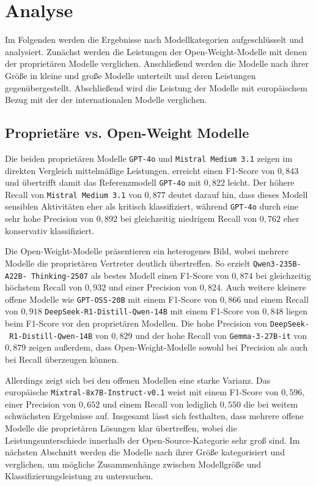 \section{Analyse}\label{sec:analyse}

Im Folgenden werden die Ergebnisse nach Modellkategorien aufgeschlüsselt und analysiert. Zunächst werden die Leistungen der Open-Weight-Modelle mit denen der proprietären Modelle verglichen. Anschließend werden die Modelle nach ihrer Größe in kleine und große Modelle unterteilt und deren Leistungen gegenübergestellt. Abschließend wird die Leistung der Modelle mit europäischem Bezug mit der der internationalen Modelle verglichen.

\subsection*{Proprietäre vs. Open-Weight Modelle}

Die beiden proprietären Modelle \texttt{GPT-4o} und \texttt{Mistral Medium 3.1} zeigen im direkten Vergleich mittelmäßige Leistungen.  erreicht einen F1-Score von $0{,}843$ und übertrifft damit das Referenzmodell \texttt{GPT-4o} mit $0{,}822$ leicht. Der höhere Recall von \texttt{Mistral Medium 3.1} von $0{,}877$ deutet darauf hin, dass dieses Modell sensiblen Aktivitäten eher als kritisch klassifiziert, während \texttt{GPT-4o} durch eine sehr hohe Precision von $0{,}892$ bei gleichzeitig niedrigem Recall von $0{,}762$ eher konservativ klassifiziert.

Die Open-Weight-Modelle präsentieren ein heterogenes Bild, wobei mehrere Modelle die proprietären Vertreter deutlich übertreffen. So erzielt \texttt{Qwen3-235B-A22B-\linebreak~Thinking-2507} als bestes Modell einen F1-Score von $0{,}874$ bei gleichzeitig höchstem Recall von $0{,}932$ und einer Precision von $0{,}824$. Auch weitere kleinere offene Modelle wie \texttt{GPT-OSS-20B} mit einem F1-Score von $0{,}866$ und einem Recall von $0{,}918$ \texttt{DeepSeek-R1-Distill-Qwen-14B} mit einem F1-Score von $0{,}848$ liegen beim F1-Score vor den proprietären Modellen. Die hohe Precision von \texttt{DeepSeek-\linebreak~R1-Distill-Qwen-14B} von $0{,}829$ und der hohe Recall von \texttt{Gemma-3-27B-it} von $0{,}879$ zeigen außerdem, dass Open-Weight-Modelle sowohl bei Precision als auch bei Recall überzeugen können.

Allerdings zeigt sich bei den offenen Modellen eine starke Varianz. Das europäische \texttt{Mixtral-8x7B-Instruct-v0.1} weist mit einem F1-Score von $0{,}596$, einer Precision von $0{,}652$ und einem Recall von lediglich $0{,}550$ die bei weitem schwächsten Ergebnisse auf. Insgesamt lässt sich festhalten, dass mehrere offene Modelle die proprietären Lösungen klar übertreffen, wobei die Leistungsunterschiede innerhalb der Open‑Source‑Kategorie sehr groß sind. Im nächsten Abschnitt werden die Modelle nach ihrer Größe kategorisiert und verglichen, um mögliche Zusammenhänge zwischen Modellgröße und Klassifizierungsleistung zu untersuchen.

